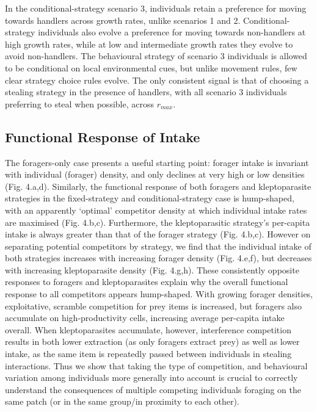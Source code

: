 \documentclass[11pt]{article}
\begin{document}
In the conditional-strategy scenario 3, individuals retain a preference for moving towards handlers across growth rates, unlike scenarios 1 and 2.
Conditional-strategy individuals also evolve a preference for moving towards non-handlers at high growth rates, while at low and intermediate growth rates they evolve to avoid non-handlers.
The behavioural strategy of scenario 3 individuals is allowed to be conditional on local environmental cues, but unlike movement rules, few clear strategy choice rules evolve.
The only consistent signal is that of choosing a stealing strategy in the presence of handlers, with all scenario 3 individuals preferring to steal when possible, across $r_{max}$.

\subsection{Functional Response of Intake}

The foragers-only case presents a useful starting point: forager intake is invariant with individual (forager) density, and only declines at very high or low densities (Fig. 4.a,d).
Similarly, the functional response of both foragers and kleptoparasite strategies in the fixed-strategy and conditional-strategy case is hump-shaped, with an apparently `optimal' competitor density at which individual intake rates are maximised (Fig. 4.b,c).
Furthermore, the kleptoparasitic strategy's per-capita intake is always greater than that of the forager strategy (Fig. 4.b,c).
However on separating potential competitors by strategy, we find that the individual intake of both strategies increases with increasing forager density (Fig. 4.e,f), but decreases with increasing kleptoparasite density (Fig. 4.g,h).
These consistently opposite responses to foragers and kleptoparasites explain why the overall functional response to all competitors appears hump-shaped.
With growing forager densities, exploitative, scramble competition for prey items is increased, but foragers also accumulate on high-productivity cells, increasing average per-capita intake overall.
When kleptoparasites accumulate, however, interference competition results in both lower extraction (as only foragers extract prey) as well as lower intake, as the same item is repeatedly passed between individuals in stealing interactions.
Thus we show that taking the type of competition, and behavioural variation among individuals more generally into account is crucial to correctly understand the consequences of multiple competing individuals foraging on the same patch (or in the same group/in proximity to each other).
\end{document}
